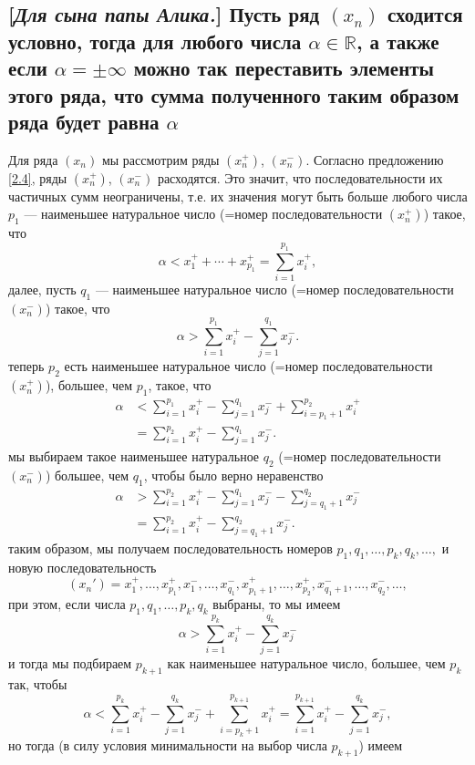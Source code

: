 \documentclass[a4paper]{article}
\begin{document}
\subsection{[\textit{Для сына папы Алика.}] Пусть ряд $(x_n)$ сходится условно, тогда для любого числа $\alpha\in\mathbb{R}$, а также если $\alpha=\pm\infty$ можно так переставить элементы этого ряда, что сумма полученного таким образом ряда будет равна $\alpha$}
Для ряда $(x_n)$ мы рассмотрим ряды $(x_n^+)$, $(x_n^-)$. Согласно предложению \ref{2.4}, ряды $(x_n^+)$, $(x_n^-)$ расходятся. Это значит, что последовательности их частичных сумм неограничены, т.е. их значения могут быть больше любого числа\\[2mm]
 $p_1$ — наименьшее натуральное число (=номер последовательности $(x_n^+)$) такое, что
$$
\alpha < x_1^+ + \cdots + x_{p_1}^+  = \sum_{i=1}^{p_1}x_i^+,
$$
далее, пусть $q_1$ — наименьшее натуральное число (=номер последовательности $(x_n^-)$) такое, что
$$
\alpha > \sum_{i=1}^{p_1} x_i^+ - \sum_{j=1}^{q_1} x_j^-.
$$
 теперь $p_2$ есть наименьшее натуральное число (=номер последовательности $(x_n^+)$), большее, чем $p_1$, такое, что
$$\begin{aligned}
\alpha &< \sum_{i=1}^{p_1} x_i^+ - \sum_{j=1}^{q_1} x_j^- + \sum_{i={p_1}+1}^{p_2}x_i^+\\
&= \sum_{i=1}^{p_2} x_i^+ - \sum_{j=1}^{q_1} x_j^- .    
\end{aligned}$$
 мы выбираем такое наименьшее натуральное $q_2$ (=номер последовательности $(x_n^-)$) большее, чем $q_1$, чтобы было верно неравенство
$$\begin{aligned}
\alpha &> \sum_{i=1}^{p_2} x_i^+ - \sum_{j=1}^{q_1} x_j^- - \sum_{j={q_1}+1}^{q_2}x_j^-\\
&=\sum_{i=1}^{p_2} x_i^+ -  \sum_{j={q_1}+1}^{q_2}x_j^-.
\end{aligned}$$
 таким образом, мы получаем последовательность номеров $p_1, q_1,\ldots, p_k,q_k,\ldots,$ и новую последовательность 
$$
(x_n') = x_1^+, \ldots, x_{p_1}^+, x_1^-, \ldots, x_{q_1}^-, x_{p_1+1}^+, \ldots, x_{p_2}^+, x_{q_1+1}^-, \ldots, x_{q_2}^-, \ldots,
$$
при этом, если числа $p_1,q_1, \ldots, p_k, q_k$ выбраны, то мы имеем
$$
\alpha > \sum_{i=1}^{p_k} x_i^+ - \sum_{j=1}^{q_k} x_j^-
$$
и тогда мы подбираем $p_{k+1}$ как наименьшее натуральное число, большее, чем $p_k$ так, чтобы
$$
\alpha < \sum_{i=1}^{p_k}x_i^+ - \sum_{j=1}^{q_k} x_j^- + \sum_{i=p_k+1}^{p_{k+1}} x_i^+ = \sum_{i=1}^{p_{k+1}}x_i^+ - \sum_{j=1}^{q_k}x_j^-,
$$
но тогда (в силу условия минимальности на выбор числа $p_{k+1}$) имеем
\end{document}
